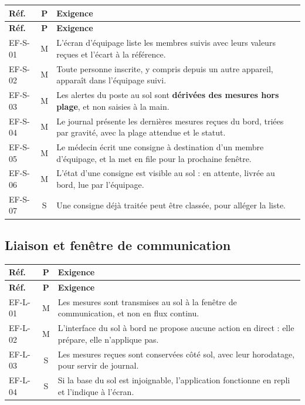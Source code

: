 \documentclass[11pt,a4paper]{article}
\begin{document}
\begin{longtable}{@{}L{1.9cm} c L{12.1cm}@{}}
\toprule
\textbf{R\'ef.} & \textbf{P} & \textbf{Exigence} \\
\midrule
\endfirsthead
\toprule
\textbf{R\'ef.} & \textbf{P} & \textbf{Exigence} \\
\midrule
\endhead
\bottomrule
\endfoot
EF-S-01 & M & L'\'ecran d'\'equipage liste les membres suivis avec leurs valeurs re\c{c}ues et l'\'ecart \`a la r\'ef\'erence. \\
EF-S-02 & M & Toute personne inscrite, y compris depuis un autre appareil, appara\^it dans l'\'equipage suivi. \\
EF-S-03 & M & Les alertes du poste au sol sont \textbf{d\'eriv\'ees des mesures hors plage}, et non saisies \`a la main. \\
EF-S-04 & M & Le journal pr\'esente les derni\`eres mesures re\c{c}ues du bord, tri\'ees par gravit\'e, avec la plage attendue et le statut. \\
EF-S-05 & M & Le m\'edecin \'ecrit une consigne \`a destination d'un membre d'\'equipage, et la met en file pour la prochaine fen\^etre. \\
EF-S-06 & M & L'\'etat d'une consigne est visible au sol : en attente, livr\'ee au bord, lue par l'\'equipage. \\
EF-S-07 & S & Une consigne d\'ej\`a trait\'ee peut \^etre class\'ee, pour all\'eger la liste. \\
\end{longtable}

\subsection{Liaison et fen\^etre de communication}

\begin{longtable}{@{}L{1.9cm} c L{12.1cm}@{}}
\toprule
\textbf{R\'ef.} & \textbf{P} & \textbf{Exigence} \\
\midrule
\endfirsthead
\toprule
\textbf{R\'ef.} & \textbf{P} & \textbf{Exigence} \\
\midrule
\endhead
\bottomrule
\endfoot
EF-L-01 & M & Les mesures sont transmises au sol \`a la fen\^etre de communication, et non en flux continu. \\
EF-L-02 & M & L'interface du sol \`a bord ne propose aucune action en direct : elle pr\'epare, elle n'applique pas. \\
EF-L-03 & S & Les mesures re\c{c}ues sont conserv\'ees c\^ot\'e sol, avec leur horodatage, pour servir de journal. \\
EF-L-04 & S & Si la base du sol est injoignable, l'application fonctionne en repli et l'indique \`a l'\'ecran. \\
\end{longtable}
\end{document}
